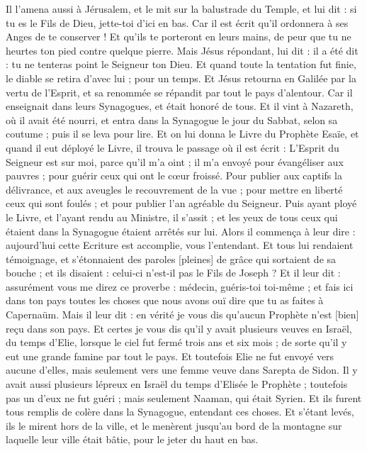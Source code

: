 \begin{multicols}{2}
Il l'amena aussi à Jérusalem, et le mit sur la balustrade du Temple, et lui dit : si tu es le Fils de Dieu, jette-toi d'ici en bas.
Car il est écrit qu'il ordonnera à ses Anges de te conserver !
Et qu'ils te porteront en leurs mains, de peur que tu ne heurtes ton pied contre quelque pierre.
Mais Jésus répondant, lui dit : il a été dit : tu ne tenteras point le Seigneur ton Dieu.
Et quand toute la tentation fut finie, le diable se retira d'avec lui ; pour un temps.
Et Jésus retourna en Galilée par la vertu de l'Esprit, et sa renommée se répandit par tout le pays d'alentour.
Car il enseignait dans leurs Synagogues, et était honoré de tous.
Et il vint à Nazareth, où il avait été nourri, et entra dans la Synagogue le jour du Sabbat, selon sa coutume ; puis il se leva pour lire.
Et on lui donna le Livre du Prophète Esaïe, et quand il eut déployé le Livre, il trouva le passage où il est écrit :
L'Esprit du Seigneur est sur moi, parce qu'il m'a oint ; il m'a envoyé pour évangéliser aux pauvres ; pour guérir ceux qui ont le cœur froissé.
Pour publier aux captifs la délivrance, et aux aveugles le recouvrement de la vue ; pour mettre en liberté ceux qui sont foulés ; et pour publier l'an agréable du Seigneur.
Puis ayant ployé le Livre, et l'ayant rendu au Ministre, il s'assit ; et les yeux de tous ceux qui étaient dans la Synagogue étaient arrêtés sur lui.
Alors il commença à leur dire : aujourd'hui cette Ecriture est accomplie, vous l'entendant.
Et tous lui rendaient témoignage, et s'étonnaient des paroles [pleines] de grâce qui sortaient de sa bouche ; et ils disaient : celui-ci n'est-il pas le Fils de Joseph ?
Et il leur dit : assurément vous me direz ce proverbe : médecin, guéris-toi toi-même ; et fais ici dans ton pays toutes les choses que nous avons ouï dire que tu as faites à Capernaüm.
Mais il leur dit : en vérité je vous dis qu'aucun Prophète n'est [bien] reçu dans son pays.
Et certes je vous dis qu'il y avait plusieurs veuves en Israël, du temps d'Elie, lorsque le ciel fut fermé trois ans et six mois ; de sorte qu'il y eut une grande famine par tout le pays.
Et toutefois Elie ne fut envoyé vers aucune d'elles, mais seulement vers une femme veuve dans Sarepta de Sidon.
Il y avait aussi plusieurs lépreux en Israël du temps d'Elisée le Prophète ; toutefois pas un d'eux ne fut guéri ; mais seulement Naaman, qui était Syrien.
Et ils furent tous remplis de colère dans la Synagogue, entendant ces choses.
Et s'étant levés, ils le mirent hors de la ville, et le menèrent jusqu'au bord de la montagne sur laquelle leur ville était bâtie, pour le jeter du haut en bas.

\end{multicols}
